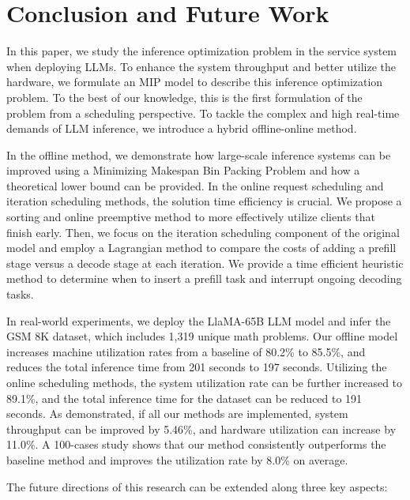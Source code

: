 \section{Conclusion and Future Work}
\label{conclusion}
In this paper, we study the inference optimization problem in the service system when deploying LLMs. To enhance the system throughput and better utilize the hardware, we formulate an MIP model to describe this inference optimization problem. To the best of our knowledge, this is the first formulation of the problem from a scheduling perspective. To tackle the complex and high real-time demands of LLM inference, we introduce a hybrid offline-online method.

In the offline method, we demonstrate how large-scale inference systems can be improved using a Minimizing Makespan Bin Packing Problem and how a theoretical lower bound can be provided. In the online request scheduling and iteration scheduling methods, the solution time efficiency is crucial. We propose a sorting and online preemptive method to more effectively utilize clients that finish early. Then, we focus on the iteration scheduling component of the original model and employ a Lagrangian method to compare the costs of adding a prefill stage versus a decode stage at each iteration. We provide a time efficient heuristic method to determine when to insert a prefill task and interrupt ongoing decoding tasks. 

In real-world experiments, we deploy the LlaMA-65B LLM model and infer the GSM 8K dataset, which includes 1,319 unique math problems. Our offline model increases machine utilization rates from a baseline of 80.2\% to 85.5\%, and reduces the total inference time from 201 seconds to 197 seconds. Utilizing the online scheduling methods, the system utilization rate can be further increased to 89.1\%, and the total inference time for the dataset can be reduced to 191 seconds. As demonstrated, if all our methods are implemented, system throughput can be improved by 5.46\%, and hardware utilization can increase by 11.0\%. A 100-cases study shows that our method consistently outperforms the baseline method and improves the utilization rate by 8.0\% on average.

The future directions of this research can be extended along three key aspects:

